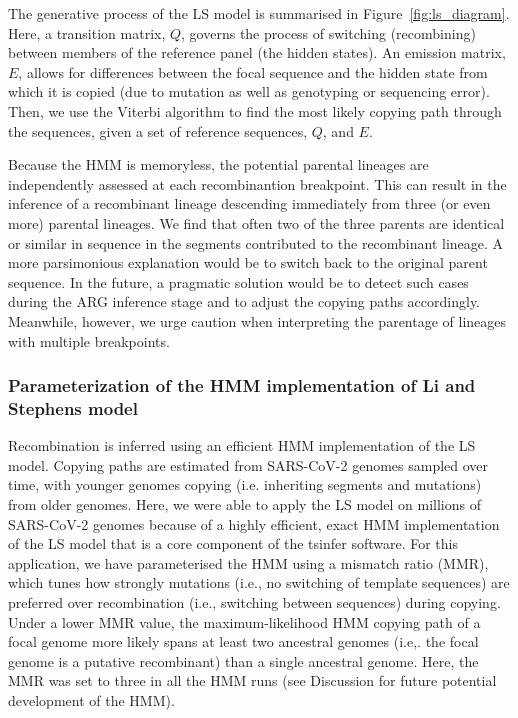 \documentclass{article}
\begin{document}
The generative process of the LS model is summarised in
Figure~\ref{fig:ls_diagram}.
Here, a
transition matrix, $Q$, governs the process of switching (recombining) between
members of the reference panel (the hidden states). An emission matrix,
$E$, allows for differences between the focal sequence and the hidden
state from which it is copied (due to mutation as well as genotyping or
sequencing error). Then, we use the Viterbi algorithm \citep{Viterbi1967-ol} to
find the most likely copying path through the sequences, given a set of
reference sequences, $Q$, and $E$.

Because the HMM is memoryless, the potential parental lineages are
independently assessed at each recombinantion breakpoint. This can result in
the inference of a recombinant lineage descending immediately from three (or
even more) parental lineages. We find that often two of the three parents are
identical or similar in sequence in the segments contributed to the recombinant
lineage. A more parsimonious explanation would be to switch back to the
original parent sequence. In the future, a pragmatic solution would be to
detect such cases during the ARG inference stage and to adjust the copying
paths accordingly. Meanwhile, however, we urge caution when interpreting the
parentage of lineages with multiple breakpoints.

\subsubsection{Parameterization of the HMM implementation of Li and Stephens
model}

Recombination is inferred using an efficient HMM implementation of the LS
model. Copying paths are estimated from SARS-CoV-2 genomes sampled over time,
with younger genomes copying (i.e. inheriting segments and mutations) from
older genomes. Here, we were able to apply the LS model on millions of
SARS-CoV-2 genomes because of a highly efficient, exact HMM implementation of
the LS model that is a core component of the tsinfer software. For this
application, we have parameterised the HMM using a mismatch ratio (MMR), which
tunes how strongly mutations (i.e., no switching of template sequences) are
preferred over recombination (i.e., switching between sequences) during
copying. Under a lower MMR value, the maximum-likelihood HMM copying path of a
focal genome more likely spans at least two ancestral genomes (i.e,. the focal
genome is a putative recombinant) than a single ancestral genome. Here, the MMR
was set to three in all the HMM runs (see Discussion for future potential
development of the HMM).
\end{document}
